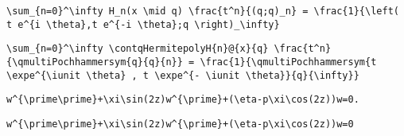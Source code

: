 \newsavebox\DMMA
\begin{lrbox}{\DMMA}
 \begin{minipage}[t]{0.82\textwidth}
  \lstinline[language={[latex]TeX},mathescape,breaklines=true]""
 \end{minipage}
\end{lrbox}
\newsavebox\DNT
\begin{lrbox}{\DNT}
 \begin{minipage}[t]{0.82\textwidth}
  \lstinline[language={[latex]TeX},mathescape,breaklines=true]"\sum_{n=0}^\infty H_n(x \mid q) \frac{t^n}{(q;q)_n} = \frac{1}{\left( t e^{i \theta},t e^{-i \theta};q \right)_\infty}"
 \end{minipage}
\end{lrbox}
\newsavebox\DNST
\begin{lrbox}{\DNST}
 \begin{minipage}[t]{0.82\textwidth}
  \lstinline[language={[latex]TeX},mathescape,breaklines=true]"\sum_{n=0}^\infty \contqHermitepolyH{n}@{x}{q} \frac{t^n}{\qmultiPochhammersym{q}{q}{n}} = \frac{1}{\qmultiPochhammersym{t \expe^{\iunit \theta} , t \expe^{- \iunit \theta}}{q}{\infty}}"
 \end{minipage}
\end{lrbox}
\newsavebox\DNMM
\begin{lrbox}{\DNMM}
 \begin{minipage}[t]{0.82\textwidth}
  \lstinline[language={[latex]TeX},mathescape,breaklines=true]""
 \end{minipage}
\end{lrbox}
\newsavebox\DNMA
\begin{lrbox}{\DNMA}
 \begin{minipage}[t]{0.82\textwidth}
  \lstinline[language={[latex]TeX},mathescape,breaklines=true]""
 \end{minipage}
\end{lrbox}
\newsavebox\DOT
\begin{lrbox}{\DOT}
 \begin{minipage}[t]{0.82\textwidth}
  \lstinline[language={[latex]TeX},mathescape,breaklines=true]"w^{\prime\prime}+\xi\sin(2z)w^{\prime}+(\eta-p\xi\cos(2z))w=0. "
 \end{minipage}
\end{lrbox}
\newsavebox\DOST
\begin{lrbox}{\DOST}
 \begin{minipage}[t]{0.82\textwidth}
  \lstinline[language={[latex]TeX},mathescape,breaklines=true]"w^{\prime\prime}+\xi\sin(2z)w^{\prime}+(\eta-p\xi\cos(2z))w=0"
 \end{minipage}
\end{lrbox}
